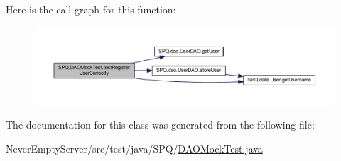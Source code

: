 Here is the call graph for this function\+:\nopagebreak
\begin{figure}[H]
\begin{center}
\leavevmode
\includegraphics[width=350pt]{class_s_p_q_1_1_d_a_o_mock_test_a52505d1cfefe105f8098147df9d2fce0_cgraph}
\end{center}
\end{figure}


The documentation for this class was generated from the following file\+:\begin{DoxyCompactItemize}
\item 
Never\+Empty\+Server/src/test/java/\+S\+P\+Q/\mbox{\hyperlink{_d_a_o_mock_test_8java}{D\+A\+O\+Mock\+Test.\+java}}\end{DoxyCompactItemize}

